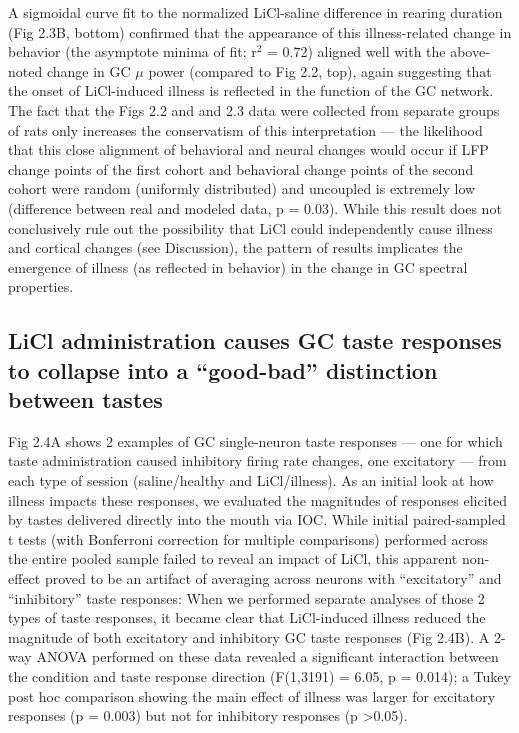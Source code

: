 \begin{refsection}
A sigmoidal curve fit to the normalized LiCl-saline difference in rearing duration (Fig 2.3B, bottom) confirmed that the appearance of this illness-related change in behavior (the asymptote minima of fit; r$^2$ = 0.72) aligned well with the above-noted change in GC \(\mu\) power (compared to Fig 2.2, top), again suggesting that the onset of LiCl-induced illness is reflected in the function of the GC network. The fact that the Figs 2.2 and and 2.3 data were collected from separate groups of rats only increases the conservatism of this interpretation --- the likelihood that this close alignment of behavioral and neural changes would occur if LFP change points of the first cohort and behavioral change points of the second cohort were random (uniformly distributed) and uncoupled is extremely low (difference between real and modeled data, p = 0.03). While this result does not conclusively rule out the possibility that LiCl could independently cause illness and cortical changes (see Discussion), the pattern of results implicates the emergence of illness (as reflected in behavior) in the change in GC spectral properties.

\subsection{LiCl administration causes GC taste responses to collapse into a “good-bad” distinction between tastes}
Fig 2.4A shows 2 examples of GC single-neuron taste responses --- one for which taste administration caused inhibitory firing rate changes, one excitatory --- from each type of session (saline/healthy and LiCl/illness). As an initial look at how illness impacts these responses, we evaluated the magnitudes of responses elicited by tastes delivered directly into the mouth via IOC. While initial paired-sampled t tests (with Bonferroni correction for multiple comparisons) performed across the entire pooled sample failed to reveal an impact of LiCl, this apparent non-effect proved to be an artifact of averaging across neurons with “excitatory” and “inhibitory” taste responses: When we performed separate analyses of those 2 types of taste responses, it became clear that LiCl-induced illness reduced the magnitude of both excitatory and inhibitory GC taste responses (Fig 2.4B). A 2-way ANOVA performed on these data revealed a significant interaction between the condition and taste response direction (F(1,3191) = 6.05, p = 0.014); a Tukey post hoc comparison showing the main effect of illness was larger for excitatory responses (p = 0.003) but not for inhibitory responses (p \textgreater 0.05).



\end{refsection}
